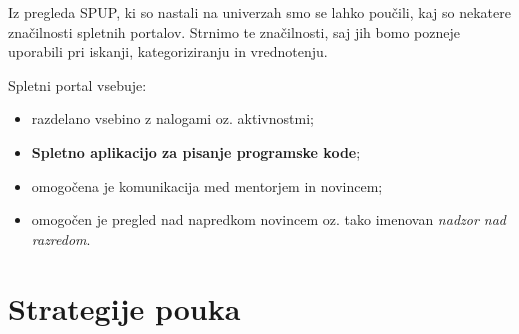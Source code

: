 Iz pregleda SPUP, ki so nastali na univerzah smo se lahko poučili, kaj
so nekatere značilnosti spletnih portalov. Strnimo te značilnosti, saj
jih bomo pozneje uporabili pri iskanji, kategoriziranju in
vrednotenju.

Spletni portal vsebuje:

\begin{itemize}
\tightlist
\item razdelano vsebino z nalogami oz. aktivnostmi;
\item \textbf{Spletno aplikacijo za pisanje programske kode};
\item omogočena je komunikacija med mentorjem in novincem;
\item omogočen je pregled nad napredkom novincem oz. tako imenovan
  \emph{nadzor nad razredom}.
\end{itemize}

\section{Strategije pouka}
\label{sec:didaktika_racunalnistva}







